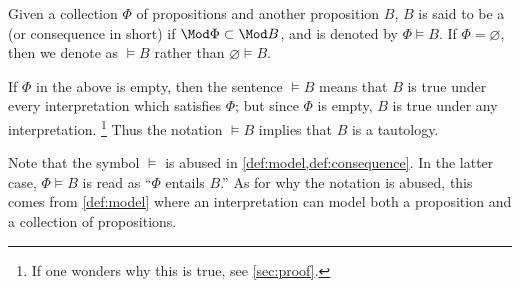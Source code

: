 \begin{definition}[Consequences]
    \label{def:consequence}
    Given a collection \(\Phi\) of propositions
    and another proposition \(B\),
    \(B\) is said to be
    a  (or consequence in short)
    if \(\Mod\Phi\subset\Mod B\),
    and is denoted by \(\Phi\models B\).
    If \(\Phi=\varnothing\),
    then we denote as \(\models B\)
    rather than \(\varnothing\models B\).
\end{definition}

If \(\Phi\) in the above is empty,
then the sentence \(\models B\) means that
\(B\) is true under every interpretation which satisfies \(\Phi\);
but since \(\Phi\) is empty,
\(B\) is true under any interpretation.%
\footnote{If one wonders why this is true,
see \cref{sec:proof}.}
Thus the notation \(\models B\) implies that \(B\) is a tautology.

Note that the symbol \(\models\) is abused
in \cref{def:model,def:consequence}.
In the latter case,
\(\Phi\models B\) is read as ``\(\Phi\) entails \(B\).''
As for why the notation is abused,
this comes from \cref{def:model}
where an interpretation can model
both a proposition and a collection of propositions.